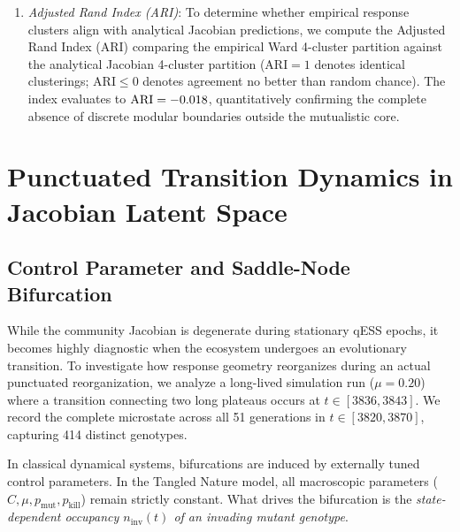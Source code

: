 \documentclass[twocolumn,amsmath,amssymb,aps,pra,10pt,floatfix,nofootinbib]{revtex4-2}
\begin{document}
\begin{enumerate}
    \item \textit{Adjusted Rand Index (ARI)}\footnotemark[2]: To determine whether empirical response clusters align with analytical Jacobian predictions, we compute the Adjusted Rand Index (ARI) comparing the empirical Ward 4-cluster partition against the analytical Jacobian 4-cluster partition ($\text{ARI}=1$ denotes identical clusterings; $\text{ARI} \le 0$ denotes agreement no better than random chance). The index evaluates to $\text{ARI} = -0.018$, quantitatively confirming the complete absence of discrete modular boundaries outside the mutualistic core.
\end{enumerate}

\section{Punctuated Transition Dynamics in Jacobian Latent Space}
\label{sec:transition}

\subsection{Control Parameter and Saddle-Node Bifurcation}

While the community Jacobian is degenerate during stationary qESS epochs, it becomes highly diagnostic when the ecosystem undergoes an evolutionary transition. To investigate how response geometry reorganizes during an actual punctuated reorganization, we analyze a long-lived simulation run ($\mu = 0.20$) where a transition connecting two long plateaus occurs at $t \in [3836, 3843]$. We record the complete microstate across all 51 generations in $t \in [3820, 3870]$, capturing 414 distinct genotypes.

In classical dynamical systems, bifurcations are induced by externally tuned control parameters. In the Tangled Nature model, all macroscopic parameters ($C, \mu, p_{\text{mut}}, p_{\text{kill}}$) remain strictly constant. What drives the bifurcation is the \textit{state-dependent occupancy $n_{\text{inv}}(t)$ of an invading mutant genotype}.
\end{document}
